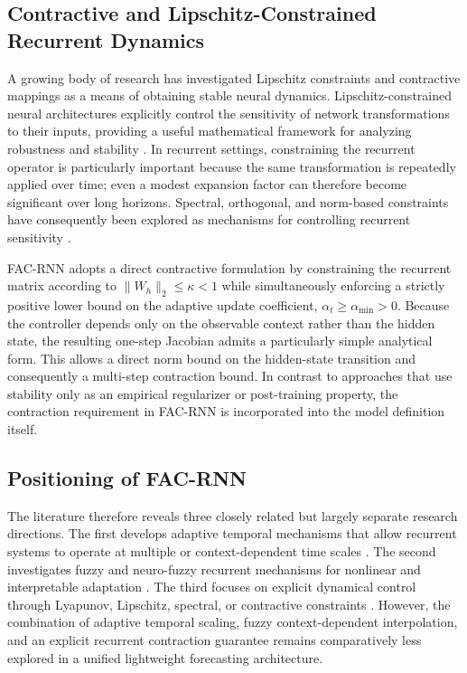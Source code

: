 \documentclass[journal]{IEEEtran}
\begin{document}
\subsection{Contractive and Lipschitz-Constrained Recurrent Dynamics}

A growing body of research has investigated Lipschitz constraints and contractive mappings as a means of obtaining stable neural dynamics. Lipschitz-constrained neural architectures explicitly control the sensitivity of network transformations to their inputs, providing a useful mathematical framework for analyzing robustness and stability \cite{erichson2021lipschitz}. In recurrent settings, constraining the recurrent operator is particularly important because the same transformation is repeatedly applied over time; even a modest expansion factor can therefore become significant over long horizons. Spectral, orthogonal, and norm-based constraints have consequently been explored as mechanisms for controlling recurrent sensitivity \cite{vorontsov2017orthogonality,zhang2018svd}.

FAC-RNN adopts a direct contractive formulation by constraining the recurrent matrix according to $\|W_h\|_2\leq\kappa<1$ while simultaneously enforcing a strictly positive lower bound on the adaptive update coefficient, $\alpha_t\geq\alpha_{\min}>0$. Because the controller depends only on the observable context rather than the hidden state, the resulting one-step Jacobian admits a particularly simple analytical form. This allows a direct norm bound on the hidden-state transition and consequently a multi-step contraction bound. In contrast to approaches that use stability only as an empirical regularizer or post-training property, the contraction requirement in FAC-RNN is incorporated into the model definition itself.

\subsection{Positioning of FAC-RNN}

The literature therefore reveals three closely related but largely separate research directions. The first develops adaptive temporal mechanisms that allow recurrent systems to operate at multiple or context-dependent time scales \cite{quax2020adaptivetimescales,tanaka2022reservoir,hasani2021ltc}. The second investigates fuzzy and neuro-fuzzy recurrent mechanisms for nonlinear and interpretable adaptation \cite{teh2018monotone,kerk2025monotone}. The third focuses on explicit dynamical control through Lyapunov, Lipschitz, spectral, or contractive constraints \cite{agand2017adaptive,erichson2021lipschitz,revay2024recurrent,vogt2022lyapunov}. However, the combination of adaptive temporal scaling, fuzzy context-dependent interpolation, and an explicit recurrent contraction guarantee remains comparatively less explored in a unified lightweight forecasting architecture.
\end{document}
